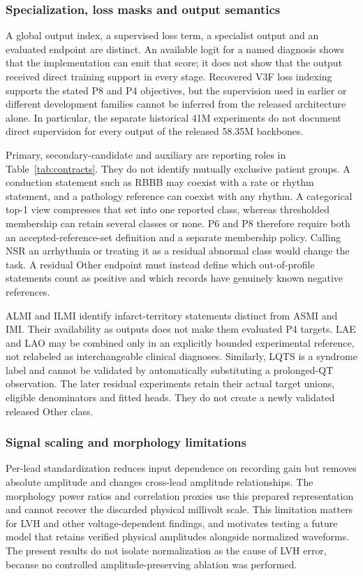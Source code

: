 \subsubsection{Specialization, loss masks and output semantics}
\label{sec:output-semantics}
A global output index, a supervised loss term, a specialist output and an evaluated endpoint are distinct. An available logit for a named diagnosis shows that the implementation can emit that score; it does not show that the output received direct training support in every stage. Recovered V3F loss indexing supports the stated P8 and P4 objectives, but the supervision used in earlier or different development families cannot be inferred from the released architecture alone. In particular, the separate historical 41M experiments do not document direct supervision for every output of the released 58.35M backbones.

Primary, secondary-candidate and auxiliary are reporting roles in Table~\ref{tab:contracts}. They do not identify mutually exclusive patient groups. A conduction statement such as RBBB may coexist with a rate or rhythm statement, and a pathology reference can coexist with any rhythm. A categorical top-1 view compresses that set into one reported class, whereas thresholded membership can retain several classes or none. P6 and P8 therefore require both an accepted-reference-set definition and a separate membership policy. Calling NSR an arrhythmia or treating it as a residual abnormal class would change the task. A residual Other endpoint must instead define which out-of-profile statements count as positive and which records have genuinely known negative references.

ALMI and ILMI identify infarct-territory statements distinct from ASMI and IMI. Their availability as outputs does not make them evaluated P4 targets. LAE and LAO may be combined only in an explicitly bounded experimental reference, not relabeled as interchangeable clinical diagnoses. Similarly, LQTS is a syndrome label and cannot be validated by automatically substituting a prolonged-QT observation. The later residual experiments retain their actual target unions, eligible denominators and fitted heads. They do not create a newly validated released Other class.

\subsubsection{Signal scaling and morphology limitations}
\label{sec:signal-limits}
Per-lead standardization reduces input dependence on recording gain but removes absolute amplitude and changes cross-lead amplitude relationships. The morphology power ratios and correlation proxies use this prepared representation and cannot recover the discarded physical millivolt scale. This limitation matters for LVH and other voltage-dependent findings, and motivates testing a future model that retains verified physical amplitudes alongside normalized waveforms. The present results do not isolate normalization as the cause of LVH error, because no controlled amplitude-preserving ablation was performed.

